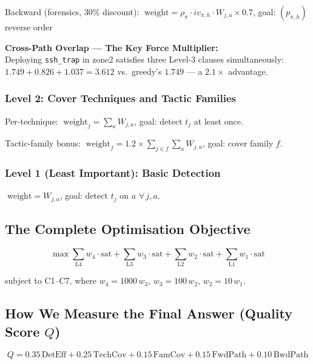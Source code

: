 \documentclass[journal]{IEEEtran}
\begin{document}
Backward (forensics, 30\% discount):
$\;\text{weight} = \rho_\pi \cdot iv_{\pi,h} \cdot W_{j,a}
\times 0.7$, \;goal: $(p_{\pi,h})$ reverse order

\begin{examplebox}
\textbf{Cross-Path Overlap --- The Key Force Multiplier:}\\
Deploying \texttt{ssh\_trap} in zone2 satisfies three
Level-3 clauses simultaneously:
$1.749 + 0.826 + 1.037 = \mathbf{3.612}$
vs.\ greedy's $1.749$ --- a $\mathbf{2.1\times}$ advantage.
\end{examplebox}

\subsubsection{Level 2: Cover Techniques and Tactic Families}

Per-technique: $\;\text{weight}_j = \sum_a W_{j,a}$,
\;goal: detect $t_j$ at least once.

Tactic-family bonus: $\;\text{weight}_f = 1.2 \times
\sum_{j \in f}\sum_a W_{j,a}$,
\;goal: cover family $f$.

\subsubsection{Level 1 (Least Important): Basic Detection}
$\;\text{weight} = W_{j,a}$,
\;goal: detect $t_j$ on $a$ $\forall\,j,a$.

\subsection{The Complete Optimisation Objective}

\begin{equation}
\max \sum_{\text{L4}} w_4 \cdot \mathrm{sat}
   + \sum_{\text{L3}} w_3 \cdot \mathrm{sat}
   + \sum_{\text{L2}} w_2 \cdot \mathrm{sat}
   + \sum_{\text{L1}} w_1 \cdot \mathrm{sat}
\end{equation}

subject to C1--C7, where
$w_4 = 1000\,w_3$, $w_3 = 100\,w_2$, $w_2 = 10\,w_1$.

\subsection{How We Measure the Final Answer (Quality Score
$Q$)}

\begin{equation}
  Q = 0.35\,\text{DetEff} + 0.25\,\text{TechCov}
    + 0.15\,\text{FamCov} + 0.15\,\text{FwdPath}
    + 0.10\,\text{BwdPath}
\end{equation}
\end{document}
